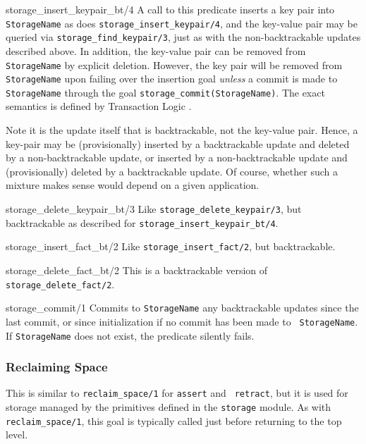 \begin{description}
{storage\_insert\_keypair\_bt/4}
A call to this predicate inserts a key pair into {\tt StorageName} as
does {\tt storage\_insert\_keypair/4}, and the key-value pair may be
queried via {\tt storage\_find\_keypair/3}, just as with the
non-backtrackable updates described above.  In addition, the key-value
pair can be removed from {\tt StorageName} by explicit deletion.
However, the key pair will be removed from {\tt StorageName} upon
failing over the insertion goal {\em unless} a commit is made to {\tt
  StorageName} through the goal {\tt storage\_commit(StorageName)}.
The exact semantics is defined by Transaction Logic \cite{BoKi94}.

Note it is the update itself that is backtrackable, not the key-value
pair.  Hence, a key-pair may be (provisionally) inserted by a
backtrackable update and deleted by a non-backtrackable update, or
inserted by a non-backtrackable update and (provisionally) deleted by
a backtrackable update.  Of course, whether such a mixture makes sense
would depend on a given application.

{storage\_delete\_keypair\_bt/3}
Like {\tt storage\_delete\_keypair/3}, but backtrackable as described
for {\tt storage\_insert\_keypair\_bt/4}.

 {storage\_insert\_fact\_bt/2}
Like {\tt storage\_insert\_fact/2}, but backtrackable.

{storage\_delete\_fact\_bt/2}
This is a backtrackable version of {\tt storage\_delete\_fact/2}.

 {storage\_commit/1}
Commits to {\tt StorageName} any backtrackable updates since the last
commit, or since initialization if no commit has been made to {\tt
  StorageName}.  If {\tt StorageName} does not exist, the predicate
silently fails.
\end{description}
\subsubsection{Reclaiming Space}
\begin{description}
This is similar to {\tt reclaim\_space/1} for {\tt assert} and {\tt
  retract}, but it is used for storage managed by the primitives defined in
the {\tt storage} module. As with {\tt reclaim\_space/1}, this goal is
typically called just before returning to the top level.
\end{description}



